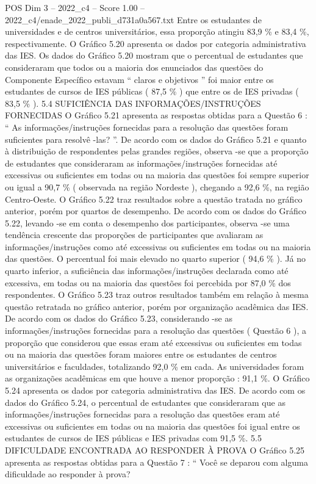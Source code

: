 \begin{textsample}{POS Dim 3 – 2022\_c4 – Score 1.00 – 2022\_c4/enade\_2022\_publi\_d731a0a567.txt}
Entre os estudantes de universidades e de centros universitários, essa proporção atingiu 83,9 \% e 83,4 \%, respectivamente.
O Gráfico 5.20 apresenta os dados por categoria administrativa das IES.
Os dados do Gráfico 5.20 mostram que o percentual de estudantes que consideraram que todos ou a maioria dos enunciados das questões do Componente Específico estavam “ claros e objetivos ” foi maior entre os estudantes de cursos de IES públicas ( 87,5 \% ) que entre os de IES privadas ( 83,5 \% ). 5.4 SUFICIÊNCIA DAS INFORMAÇÕES/INSTRUÇÕES FORNECIDAS O Gráfico 5.21 apresenta as respostas obtidas para a Questão 6 : “ As informações/instruções fornecidas para a resolução das questões foram suficientes para resolvê -las? ”.
De acordo com os dados do Gráfico 5.21 e quanto à distribuição de respondentes pelas grandes regiões, observa -se que a proporção de estudantes que consideraram as informações/instruções fornecidas até excessivas ou suficientes em todas ou na maioria das questões foi sempre superior ou igual a 90,7 \% ( observada na região Nordeste ), chegando a 92,6 \%, na região Centro-Oeste.
O Gráfico 5.22 traz resultados sobre a questão tratada no gráfico anterior, porém por quartos de desempenho.
De acordo com os dados do Gráfico 5.22, levando -se em conta o desempenho dos participantes, observa -se uma tendência crescente das proporções de participantes que avaliaram as informações/instruções como até excessivas ou suficientes em todas ou na maioria das questões.
O percentual foi mais elevado no quarto superior ( 94,6 \% ).
Já no quarto inferior, a suficiência das informações/instruções declarada como até excessiva, em todas ou na maioria das questões foi percebida por 87,0 \% dos respondentes.
O Gráfico 5.23 traz outros resultados também em relação à mesma questão retratada no gráfico anterior, porém por organização acadêmica das IES.
De acordo com os dados do Gráfico 5.23, considerando -se as informações/instruções fornecidas para a resolução das questões ( Questão 6 ), a proporção que considerou que essas eram até excessivas ou suficientes em todas ou na maioria das questões foram maiores entre os estudantes de centros universitários e faculdades, totalizando 92,0 \% em cada.
As universidades foram as organizações acadêmicas em que houve a menor proporção : 91,1 \%.
O Gráfico 5.24 apresenta os dados por categoria administrativa das IES.
De acordo com os dados do Gráfico 5.24, o percentual de estudantes que consideraram que as informações/instruções fornecidas para a resolução das questões eram até excessivas ou suficientes em todas ou na maioria das questões foi igual entre os estudantes de cursos de IES públicas e IES privadas com 91,5 \%. 5.5 DIFICULDADE ENCONTRADA AO RESPONDER À PROVA O Gráfico 5.25 apresenta as respostas obtidas para a Questão 7 : “ Você se deparou com alguma dificuldade ao responder à prova?

\end{textsample}
